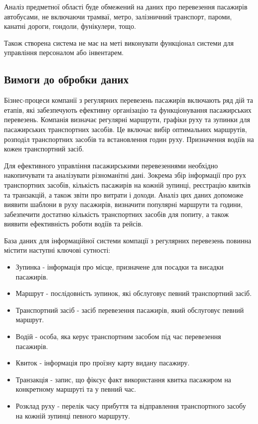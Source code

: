 \documentclass[oneside,14pt]{extarticle}
\begin{document}
Аналіз предметної області буде обмежений на даних про перевезення пасажирів автобусами, не включаючи трамваї, метро, залізничний транспорт, пароми, канатні дороги, гондоли, фунікулери, тощо.

Також створена система не має на меті виконувати функціонал системи для управління персоналом або інвентарем.

\subsection{Вимоги до обробки даних}
Бізнес-процеси компанії з регулярних перевезень пасажирів включають ряд дій та етапів, які забезпечують ефективну організацію та функціонування пасажирських перевезень. Компанія визначає регулярні маршрути, графіки руху та зупинки для пасажирських транспортних засобів. Це включає вибір оптимальних маршрутів, розподіл транспортних засобів та встановлення годин руху. Призначення водіїв на кожен транспортний засіб.

Для ефективного управління пасажирськими перевезеннями необхідно накопичувати та аналізувати різноманітні дані. Зокрема збір інформації про рух транспортних засобів, кількість пасажирів на кожній зупинці, реєстрацію квитків та транзакцій, а також звіти про витрати і доходи. Аналіз цих даних допоможе виявити шаблони в руху пасажирів, визначити популярні маршрути та години, забезпечити достатню кількість транспортних засобів для попиту, а також виявити ефективність роботи водіїв та рейсів.

База даних для інформаційної системи компації з регулярних перевезень повинна містити наступні ключові сутності:
\begin{itemize}
\item Зупинка - інформація про місце, призначене для посадки та висадки пасажирів.
\item Маршрут - послідовність зупинок, які обслуговує певний транспортний засіб.
\item Транспортний засіб - засіб перевезення пасажирів, який обслуговує певний маршрут.
\item Водій - особа, яка керує транспортним засобом під час перевезення пасажирів.
\item Квиток - інформація про проїзну карту видану пасажиру.
\item Транзакція - запис, що фіксує факт використання квитка пасажиром на конкретному маршруті та у певний час.
\item Розклад руху - перелік часу прибуття та відправлення транспортного засобу на кожній зупинці певного маршруту.
\end{itemize}
\end{document}
